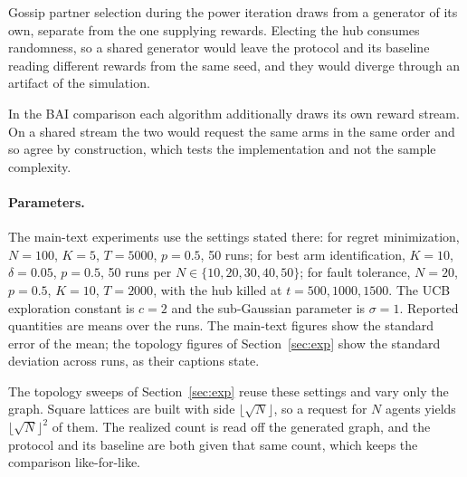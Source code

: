 \documentclass[letterpaper]{article} %
\begin{document}
Gossip partner selection during the power iteration draws from a generator of
its own, separate from the one supplying rewards. Electing the hub consumes
randomness, so a shared generator would leave the protocol and its baseline
reading different rewards from the same seed, and they would diverge through
an artifact of the simulation.

In the BAI comparison each algorithm additionally draws its own reward stream.
On a shared stream the two would request the same arms in the same order and
so agree by construction, which tests the implementation and not the sample
complexity.

\paragraph{Parameters.} The main-text experiments use the settings stated
there: for regret minimization, $N=100$, $K=5$, $T=5000$, $p=0.5$, 50 runs; for
best arm identification, $K=10$, $\delta=0.05$, $p=0.5$, 50 runs per $N \in
\{10,20,30,40,50\}$; for fault tolerance, $N=20$, $p=0.5$, $K=10$, $T=2000$,
with the hub killed at $t=500,1000,1500$. The UCB exploration constant is $c=2$
and the sub-Gaussian parameter is $\sigma=1$. Reported quantities are means
over the runs. The main-text figures show the standard error of the mean; the
topology figures of Section~\ref{sec:exp} show the standard deviation across
runs, as their captions state.

The topology sweeps of Section~\ref{sec:exp} reuse these settings and vary only
the graph. Square lattices are built with side $\lfloor\sqrt N\rfloor$, so a
request for $N$ agents yields $\lfloor\sqrt N\rfloor^2$ of them. The realized
count is read off the generated graph, and the protocol and its baseline are
both given that same count, which keeps the comparison like-for-like.


\end{document}
